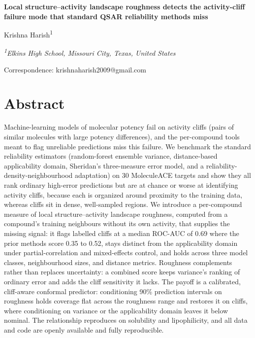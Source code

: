 \documentclass[11pt,letterpaper]{article}
\begin{document}
\begin{center}
  {\LARGE\bfseries Local structure--activity landscape roughness detects the activity-cliff failure mode that standard QSAR reliability methods miss\par}
  \vspace{1.0em}
  {\large Krishna Harish\textsuperscript{1}\par}
  \vspace{0.5em}
  {\itshape \textsuperscript{1}Elkins High School, Missouri City, Texas, United States\par}
  \vspace{0.3em}
  {Correspondence: krishnaharish2009@gmail.com\par}
\end{center}
\vspace{0.5em}

\section*{Abstract}
\noindent Machine-learning models of molecular potency fail on activity cliffs (pairs of similar molecules with large potency differences), and the per-compound tools meant to flag unreliable predictions miss this failure. We benchmark the standard reliability estimators (random-forest ensemble variance, distance-based applicability domain, Sheridan's three-measure error model, and a reliability-density-neighbourhood adaptation) on 30 MoleculeACE targets and show they all rank ordinary high-error predictions but are at chance or worse at identifying activity cliffs, because each is organized around proximity to the training data, whereas cliffs sit in dense, well-sampled regions. We introduce a per-compound measure of local structure--activity landscape roughness, computed from a compound's training neighbours without its own activity, that supplies the missing signal: it flags labelled cliffs at a median ROC-AUC of 0.69 where the prior methods score 0.35 to 0.52, stays distinct from the applicability domain under partial-correlation and mixed-effects control, and holds across three model classes, neighbourhood sizes, and distance metrics. Roughness complements rather than replaces uncertainty: a combined score keeps variance's ranking of ordinary error and adds the cliff sensitivity it lacks. The payoff is a calibrated, cliff-aware conformal predictor: conditioning 90\% prediction intervals on roughness holds coverage flat across the roughness range and restores it on cliffs, where conditioning on variance or the applicability domain leaves it below nominal. The relationship reproduces on solubility and lipophilicity, and all data and code are openly available and fully reproducible.
\end{document}
